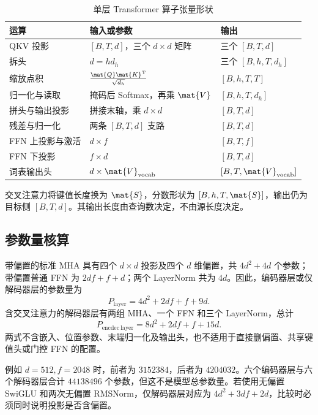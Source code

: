 \documentclass[../textbook.tex]{subfiles}
\begin{document}
\begin{table}[htbp]
\centering
\caption{单层 Transformer 算子张量形状}\label{tab:transformer-tensor-shapes}
\begin{tabularx}{\linewidth}{p{28mm}p{44mm}X}
\toprule 运算 & 输入或参数 & 输出\\\midrule
QKV 投影 & $[B,T,d]$，三个 $d\times d$ 矩阵 & 三个 $[B,T,d]$\\
拆头 & $d=hd_h$ & 三个 $[B,h,T,d_h]$\\
缩放点积 & $\frac{\mat{Q}\mat{K}^{\mathrm{T}}}{\sqrt{d_h}}$ & $[B,h,T,T]$\\
归一化与读取 & 掩码后 Softmax，再乘 $\mat{V}$ & $[B,h,T,d_h]$\\
拼头与输出投影 & 拼接末轴，乘 $d\times d$ & $[B,T,d]$\\
残差与归一化 & 两条 $[B,T,d]$ 支路 & $[B,T,d]$\\
FFN 上投影与激活 & $d\times f$ & $[B,T,f]$\\
FFN 下投影 & $f\times d$ & $[B,T,d]$\\
词表输出头 & $d\times \mat{V}_{\mathrm{vocab}}$ & $[B,T,\mat{V}_{\mathrm{vocab}}]$\\
\bottomrule
\end{tabularx}
\end{table}
交叉注意力将键值长度换为 $\mat{S}$，分数形状为 $[B,h,T,\mat{S}]$，输出仍为目标侧 $[B,T,d]$。其输出长度由查询数决定，不由源长度决定。

\subsection{参数量核算}
带偏置的标准 MHA 具有四个 $d\times d$ 投影及四个 $d$ 维偏置，共 $4d^2+4d$ 个参数；带偏置普通 FFN 为 $2df+f+d$；两个 LayerNorm 共为 $4d$。因此，编码器层或仅解码器层的参数量为
\begin{equation}
 P_{\mathrm{layer}}=4d^2+2df+f+9d.
\end{equation}
含交叉注意力的解码器层有两组 MHA、一个 FFN 和三个 LayerNorm，总计
\begin{equation}
 P_{\mathrm{encdec\ layer}}=8d^2+2df+f+15d.
\end{equation}
两式不含嵌入、位置参数、末端归一化及输出头，也不适用于直接删偏置、共享键值头或门控 FFN 的配置。

例如 $d=512,f=2048$ 时，前者为 $\num{3152384}$，后者为 $\num{4204032}$。六个编码器层与六个解码器层合计 $\num{44138496}$ 个参数，但这不是模型总参数量。若使用无偏置 SwiGLU 和两次无偏置 RMSNorm，仅解码器层对应为 $4d^2+3df+2d$，比较时必须同时说明投影是否含偏置。
\end{document}
